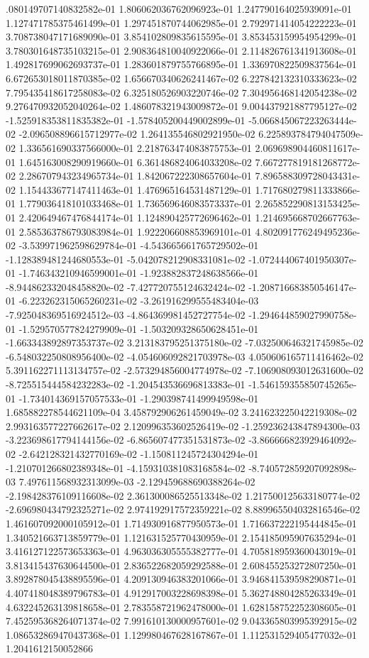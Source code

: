 .080149707140832582e-01	1.806062036762096923e-01	1.247790164025939091e-01	1.127471785375461499e-01	1.297451870744062985e-01	2.792971414054222223e-01	3.708738047171689090e-01	3.854102809835615595e-01	3.853453159954954299e-01	3.780301648735103215e-01	2.908364810040922066e-01	2.114826761341913608e-01	1.492817699062693737e-01	1.283601879755766895e-01	1.336970822509837564e-01	6.672653018011870385e-02	1.656670340626241467e-02	6.227842132310333623e-02	7.795435418617258083e-02	6.325180526903220746e-02	7.304956468142054238e-02	9.276470932052040264e-02	1.486078321943009872e-01	9.004437921887795127e-02	-1.525918353811835382e-01	-1.578405200449002899e-01	-5.066845067223263444e-02	-2.096508896615712977e-02	1.264135546802921950e-02	6.225893784794047509e-02	1.336561690337566000e-01	2.218763474083875753e-01	2.069698904460811617e-01	1.645163008290919660e-01	6.361486824064033208e-02	7.667277819181268772e-02	2.286707943234965734e-01	1.842067222308657604e-01	7.896588309728043431e-02	1.154433677147411463e-01	1.476965164531487129e-01	1.717680279811333866e-01	1.779036418101033468e-01	1.736569646083573337e-01	2.265852290813153425e-01	2.420649467476844174e-01	1.124890425772696462e-01	1.214695668702667763e-01	2.585363786793083984e-01	1.922206608853969101e-01	4.802091776249495236e-02	-3.539971962598629784e-01	-4.543665661765729502e-01	-1.128389481244680553e-01	-5.042078212908331081e-02	-1.072444067401950307e-01	-1.746343210946599001e-01	-1.923882837248638566e-01	-8.944862332048458820e-02	-7.427720755124632424e-02	-1.208716683850546147e-01	-6.223262315065260231e-02	-3.261916299555483404e-03	-7.925048369516924512e-03	-4.864369981452727754e-02	-1.294644859027990758e-01	-1.529570577824279909e-01	-1.503209328650628451e-01	-1.663343892897353737e-02	3.213183795251375180e-02	-7.032500646321745985e-02	-6.548032250808956400e-02	-4.054606092821703978e-03	4.050606165711416462e-02	5.391162271113134757e-02	-2.573294856004774978e-02	-7.106908093012631600e-02	-8.725515444584232283e-02	-1.204543536696813383e-01	-1.546159355850745265e-01	-1.734014369157057533e-01	-1.290398741499949598e-01	1.685882278544621109e-04	3.458792906261459049e-02	3.241623225042219308e-02	2.993163577227662617e-02	2.120996353602526419e-02	-1.259236243847894300e-03	-3.223698617794144156e-02	-6.865607477351531873e-02	-3.866666823929464092e-02	-2.642128321432770169e-02	-1.150811245724304294e-01	-1.210701266802389348e-01	-4.159310381083168584e-02	-8.740572859207092898e-03	7.497611568932313099e-03	-2.129459688690388264e-02	-2.198428376109116608e-02	2.361300086525513348e-02	1.217500125633180774e-02	-2.696980434792325271e-02	2.974192917572359221e-02	8.889965504032816546e-02	1.461607092000105912e-01	1.714930916877950573e-01	1.716637222195444845e-01	1.340521663713859779e-01	1.121631525770430959e-01	2.154185095907635294e-01	3.416127122573653363e-01	4.963036305555382777e-01	4.705818959360043019e-01	3.813415437630644500e-01	2.836522682059292588e-01	2.608455253272807250e-01	3.892878045438895596e-01	4.209130946383201066e-01	3.946841539598290871e-01	4.407418048389796783e-01	4.912917003228698398e-01	5.362748804285263349e-01	4.632245263139818658e-01	2.783558721962478000e-01	1.628158752252308605e-01	7.452595368264071374e-02	7.991610130000957601e-02	9.043365803995392915e-02	1.086532869470437368e-01	1.129980467628167867e-01	1.112531529405477032e-01	1.2041612150052866